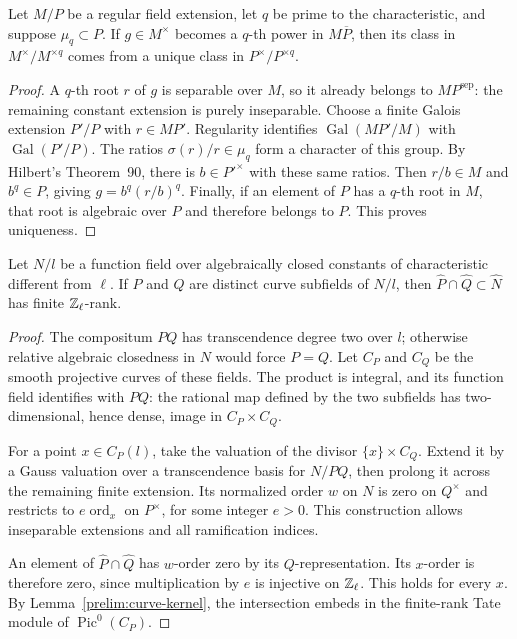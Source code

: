 \begin{lemma}\label{recovery:kummer-descent}
Let $M/P$ be a regular field extension, let $q$ be prime to the
characteristic, and suppose $\mu_q\subset P$. If
$g\in M^\times$ becomes a $q$-th power in $M\overline P$, then its
class in $M^\times/M^{\times q}$ comes from a unique class in
$P^\times/P^{\times q}$.
\end{lemma}

\begin{proof}
A $q$-th root $r$ of $g$ is separable over $M$, so it already belongs to
$MP^{\mathrm{sep}}$: the remaining constant extension is purely
inseparable. Choose a finite Galois extension $P'/P$ with $r\in MP'$.
Regularity identifies
$\operatorname{Gal}(MP'/M)$ with $\operatorname{Gal}(P'/P)$.
The ratios $\sigma(r)/r\in\mu_q$ form a character of this group.
By Hilbert's Theorem~90, there is $b\in P'^\times$ with these same
ratios. Then $r/b\in M$ and $b^q\in P$, giving
$g=b^q(r/b)^q$. Finally, if an element of $P$ has a $q$-th root in
$M$, that root is algebraic over $P$ and therefore belongs to $P$.
This proves uniqueness.
\end{proof}

\begin{lemma}\label{recovery:intersection}
Let $N/l$ be a function field over algebraically closed constants of
characteristic different from $\ell$. If $P$ and $Q$ are distinct
curve subfields of $N/l$, then
$\widehat P\cap\widehat Q\subset\widehat N$ has finite
$\mathbb Z_\ell$-rank.
\end{lemma}

\begin{proof}
The compositum $PQ$ has transcendence degree two over $l$; otherwise
relative algebraic closedness in $N$ would force $P=Q$. Let $C_P$ and
$C_Q$ be the smooth projective curves of these fields. The product is
integral, and its function field identifies with $PQ$: the rational
map defined by the two subfields has two-dimensional, hence dense,
image in $C_P\times C_Q$.

For a point $x\in C_P(l)$, take the valuation of the divisor
$\{x\}\times C_Q$. Extend it by a Gauss valuation over a transcendence
basis for $N/PQ$, then prolong it across the remaining finite
extension. Its normalized order $w$ on $N$ is zero on $Q^\times$ and
restricts to $e\operatorname{ord}_x$ on $P^\times$, for some integer
$e>0$. This construction allows inseparable extensions and all
ramification indices.

An element of $\widehat P\cap\widehat Q$ has $w$-order zero by its
$Q$-representation. Its $x$-order is therefore zero, since
multiplication by $e$ is injective on $\mathbb Z_\ell$. This holds for every
$x$. By Lemma~\ref{prelim:curve-kernel}, the intersection embeds in
the finite-rank Tate module of $\operatorname{Pic}^0(C_P)$.
\end{proof}

